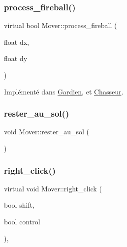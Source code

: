 \mbox{\label{classMover_a6d794056f34e2348d32ae4ff49326070}} 
\subsubsection{\texorpdfstring{process\+\_\+fireball()}{process\_fireball()}}
{\footnotesize\ttfamily virtual bool Mover\+::process\+\_\+fireball (\begin{DoxyParamCaption}\item[{float}]{dx,  }\item[{float}]{dy }\end{DoxyParamCaption})\hspace{0.3cm}{\ttfamily [pure virtual]}}



Implémenté dans \hyperlink{classGardien_ad1d0f6aca8be28477e16dae7a30301b8}{Gardien}, et \hyperlink{classChasseur_a00710f53a84dfcf6ae60deed589cea1e}{Chasseur}.

\mbox{\label{classMover_a05ac684f0ace96b717bb9aa016671e8e}} 
\subsubsection{\texorpdfstring{rester\+\_\+au\+\_\+sol()}{rester\_au\_sol()}}
{\footnotesize\ttfamily void Mover\+::rester\+\_\+au\+\_\+sol (\begin{DoxyParamCaption}{ }\end{DoxyParamCaption})}

\mbox{\label{classMover_ac32ed126c01d60c6df0090dd590b70b2}} 
\subsubsection{\texorpdfstring{right\+\_\+click()}{right\_click()}}
{\footnotesize\ttfamily virtual void Mover\+::right\+\_\+click (\begin{DoxyParamCaption}\item[{bool}]{shift,  }\item[{bool}]{control }\end{DoxyParamCaption})\hspace{0.3cm}{\ttfamily [inline]}, {\ttfamily [virtual]}}



